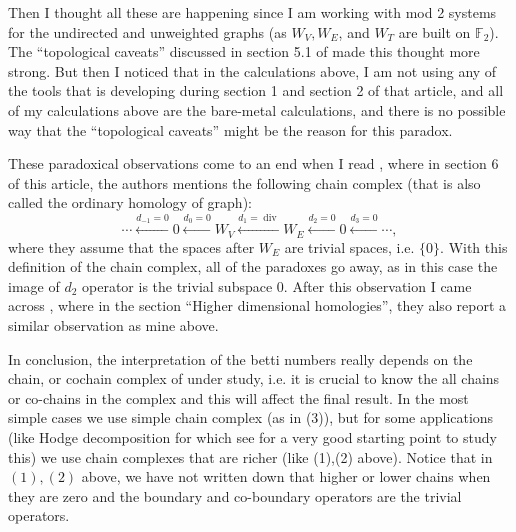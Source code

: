 \documentclass[11pt,a4paper]{article}
\renewcommand{\div}{\operatorname{div}}
\begin{document}
	
	Then I thought all these are happening since I am working with mod 2 systems for the undirected and unweighted graphs (as $ W_V, W_E $, and $ W_T $ are built on $ \mathbb{F}_2 $). The ``topological caveats'' discussed in section 5.1 of \cite{Lim2019} made this thought more strong. But then I noticed that in the calculations above, I am not using any of the tools that \cite{Lim2019} is developing during section 1 and section 2 of that article, and all of my calculations above are the bare-metal calculations, and there is no possible way that the ``topological caveats'' might be the reason for this paradox.
	
	These paradoxical observations come to an end when I read \cite{dewan2016graph}, where in section 6 of this article, the authors mentions the following chain complex (that is also called the ordinary homology of graph):
	\[ \cdots \xleftarrow{d_{-1}=0} 0 \xleftarrow{d_{0}=0} W_V \xleftarrow{d_{1}=\div} W_E \xleftarrow{d_{2}=0} 0 \xleftarrow{d_{3}=0} \cdots, \tag{3} \]
	where they assume that the spaces after $ W_E $ are trivial spaces, i.e. $ \{0\} $. With this definition of the chain complex, all of the paradoxes go away, as in this case the image of $ d_2 $ operator is the trivial subspace $ 0 $. After this observation I came across \cite{Wiki2024}, where in the section ``Higher dimensional homologies'', they also report a similar observation as mine above.
	
	In conclusion, the interpretation of the betti numbers really depends on the chain, or cochain complex of under study, i.e. it is crucial to know the all chains or co-chains in the complex and this will affect the final result. In the most simple cases we use simple chain complex (as in (3)), but for some applications (like Hodge decomposition for which see \cite{2024,Lim2019,strang2020applications} for a very good starting point to study this) we use chain complexes that are richer	(like (1),(2) above). Notice that in $ (1),(2) $ above, we have not written down that higher or lower chains when they are zero and the boundary and co-boundary operators are the trivial operators.  
	
	
	
	
	
	
	
	
	
	
\end{document}
